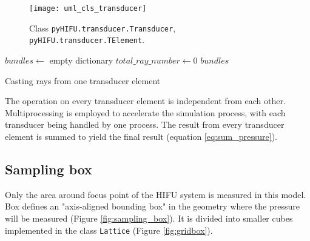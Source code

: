 \begin{figure}[h]
    \centering
    \texttt{[image: uml\_cls\_transducer]}
    \caption{Class \texttt{pyHIFU.transducer.Transducer}, \texttt{pyHIFU.transducer.TElement}.}
    \label{fig:uml_cls_transducer}
\end{figure}

\IncMargin{1em}
\begin{algorithm}[H]
    \DontPrintSemicolon
    $bundles \leftarrow$ empty dictionary\;
    $total\_ray\_number \leftarrow 0$\;
    \Return $bundles$
    \caption{Casting rays from one transducer element}\label{algo_disjdecomp}
\end{algorithm}
\DecMargin{1em}

The operation on every transducer element is independent from each other. Multiprocessing is employed to accelerate the simulation process, with each transducer being handled by one process. The result from every transducer element is summed to yield the final result (equation \ref{eq:sum_pressure}).

\subsection{Sampling box}
Only the area around focus point of the HIFU system is measured in this model. Box defines an "axis-aligned bounding box" in the geometry where the pressure will be measured (Figure \ref{fig:sampling_box}). It is divided into smaller cubes implemented in the class \texttt{Lattice} (Figure \ref{fig:gridbox}).

